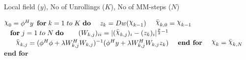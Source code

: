 \documentclass[sn-vancouver,Numbered]{sn-jnl}%
\DeclareRobustCommand{\rchi}{{\mathpalette\irchi\relax}}
\newcommand{\irchi}[2]{\raisebox{\depth}{$#1\chi$}}
\begin{document}
\begin{algorithm}[!t] 
\scriptsize
\caption{Algorithm for proposed Spinet-QSM}
\label{alg:spinet_qsm_algorithm}
\begin{algorithmic}[1]
\Require Local field ($y$), No of Unrollings ($K$), No of MM-steps ($N$)

\State $\rchi_{0}={\phi}^{H}y$
\State $\textbf{for} \hspace{1mm} k=1 \hspace{1mm} to \hspace{1mm} K \hspace{1mm} \textbf{do}$
\State $\hspace{3mm} z_k=Dw(\rchi_{k-1})$
\State $\hspace{3mm} \bar{\rchi}_{k,0}=\rchi_{k-1}$
\State $\hspace{3mm} \textbf{for} \hspace{1mm} j=1\hspace{1mm}to\hspace{1mm}N\hspace{1mm} \textbf{do}$
\State $\hspace{6mm}(W_{k,j})_{ii}=|(\bar\rchi_{k,j})_{i}-({z}_{k})_{i}|^{\frac{p}{2}-1} $
\State $\hspace{6mm}\bar{\rchi}_{k,j}= (\phi ^H\phi +\lambda W_{k,j}^{H}W_{k,j})^{-1}(\phi ^H 
y+\lambda W_{k,j}^{H}W_{k,j} z_{k})$
\State $\hspace{3mm}\textbf{end for}$
\State $\hspace{3mm}{\rchi}_{k}=\bar{\rchi}_{k,N}$
\State $\textbf{end for}$

\end{algorithmic}
\end{algorithm}
\end{document}
